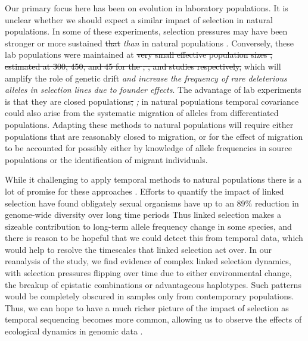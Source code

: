 \documentclass[11pt]{article}
\newcommand{\vb}[1]{{\it \color{blue} #1}}
\providecommand{\DIFaddtex}[1]{{\protect\color{blue}\uwave{#1}}} %
\providecommand{\DIFdeltex}[1]{{\protect\color{red}\sout{#1}}}                      %
\providecommand{\DIFaddbegin}{} %
\providecommand{\DIFaddend}{} %
\providecommand{\DIFdelbegin}{} %
\providecommand{\DIFdelend}{} %
\providecommand{\DIFadd}[1]{\texorpdfstring{\DIFaddtex{#1}}{#1}} %
\providecommand{\DIFdel}[1]{\texorpdfstring{\DIFdeltex{#1}}{}} %
\begin{document}
\DIFaddbegin 

\DIFaddend Our primary focus here has been on evolution in laboratory populations. It is
unclear whether we should expect a similar impact of selection in natural
populations. In some of these experiments, selection pressures may have been
stronger or more sustained \DIFdelbegin \DIFdel{that }\DIFdelend \DIFaddbegin \vb{than} \DIFaddend in natural populations
\parencite{Hendry1999-zu,Hairston2005-ga}. Conversely, these lab populations
were maintained at \DIFdelbegin \DIFdel{very small effective population sizes , estimated
at 300, 450, and 45 for the \textcite{Barghi2019-qy}, \textcite{Kelly2019-dc},
and \textcite{Castro2019-uk} studies respectively, }\DIFdelend \DIFaddbegin \DIFadd{relatively small census sizes (Table
\ref{table:study_summary}), }\DIFaddend which will amplify the role of genetic drift\DIFaddbegin \DIFadd{,
}\vb{and increase the frequency of rare deleterious alleles in selection lines
due to founder effects}\DIFaddend . The advantage of lab experiments is that they are
closed populations\DIFdelbegin \DIFdel{, }\DIFdelend \DIFaddbegin \vb{;} \DIFaddend in natural populations temporal covariance could also
arise from the systematic migration of alleles from differentiated populations.
Adapting these methods to natural populations will require either populations
that are reasonably closed to migration, or for the effect of migration to be
accounted for possibly either by knowledge of allele frequencies in source
populations or the identification of migrant individuals. 

While it challenging to apply temporal methods to natural populations there is
a lot of promise for these approaches
\parencite{Bergland2014-ij,Machado2018-cs}. Efforts to quantify the impact of
linked selection have found obligately sexual organisms have up to an 89\%
reduction in genome-wide diversity over long time periods
\parencite{McVicker2009-ax,Elyashiv2016-vt,Corbett-Detig2015-gt,Coop2016-gx,Comeron2014-nh}
Thus linked selection makes a sizeable contribution to long-term allele
frequency change in some species, and there is reason to be hopeful that we
could detect this from temporal data, which would help to resolve the
timescales that linked selection act over. In our reanalysis of the
\textcite{Barghi2019-qy} study, we find evidence of complex linked selection
dynamics, with selection pressures flipping over time due to either
environmental change, the breakup of epistatic combinations or advantageous
haplotypes. Such patterns would be completely obscured in samples only from
contemporary populations. Thus, we can hope to have a much richer picture
of the impact of selection as temporal sequencing becomes more common,
allowing us to observe the effects of ecological dynamics in genomic data
\parencite{Hairston2005-ga}.
\end{document}
